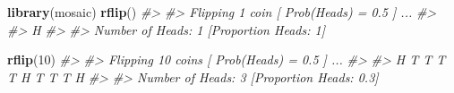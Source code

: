 \documentclass[]{book}
\makeatletter
\newenvironment{Shaded}{\begin{snugshade}}{\end{snugshade}}
\newcommand{\KeywordTok}[1]{\textcolor[rgb]{0.13,0.29,0.53}{\textbf{#1}}}
\newcommand{\DecValTok}[1]{\textcolor[rgb]{0.00,0.00,0.81}{#1}}
\newcommand{\CommentTok}[1]{\textcolor[rgb]{0.56,0.35,0.01}{\textit{#1}}}
\newcommand{\NormalTok}[1]{#1}
\newenvironment{kframe}{%
\medskip{}
\setlength{\fboxsep}{.8em}
 \def\at@end@of@kframe{}%
 \ifinner\ifhmode%
  \def\at@end@of@kframe{\end{minipage}}%
  \begin{minipage}{\columnwidth}%
 \fi\fi%
 \def\FrameCommand##1{\hskip\@totalleftmargin \hskip-\fboxsep
 \colorbox{shadecolor}{##1}\hskip-\fboxsep
     \hskip-\linewidth \hskip-\@totalleftmargin \hskip\columnwidth}%
 \MakeFramed {\advance\hsize-\width
   \@totalleftmargin\z@ \linewidth\hsize
   \@setminipage}}%
 {\par\unskip\endMakeFramed%
 \at@end@of@kframe}
\renewenvironment{Shaded}{\begin{kframe}}{\end{kframe}}
\theoremstyle{definition}
\theoremstyle{definition}
\theoremstyle{definition}
\theoremstyle{remark}
\makeatother
\begin{document}
\begin{Shaded}
\begin{Highlighting}[]
\KeywordTok{library}\NormalTok{(mosaic)}
\KeywordTok{rflip}\NormalTok{()}
\CommentTok{#> }
\CommentTok{#> Flipping 1 coin [ Prob(Heads) = 0.5 ] ...}
\CommentTok{#> }
\CommentTok{#> H}
\CommentTok{#> }
\CommentTok{#> Number of Heads: 1 [Proportion Heads: 1]}
\end{Highlighting}
\end{Shaded}

\begin{Shaded}
\begin{Highlighting}[]
\KeywordTok{rflip}\NormalTok{(}\DecValTok{10}\NormalTok{)}
\CommentTok{#> }
\CommentTok{#> Flipping 10 coins [ Prob(Heads) = 0.5 ] ...}
\CommentTok{#> }
\CommentTok{#> H T T T T H T T T H}
\CommentTok{#> }
\CommentTok{#> Number of Heads: 3 [Proportion Heads: 0.3]}
\end{Highlighting}
\end{Shaded}
\end{document}
